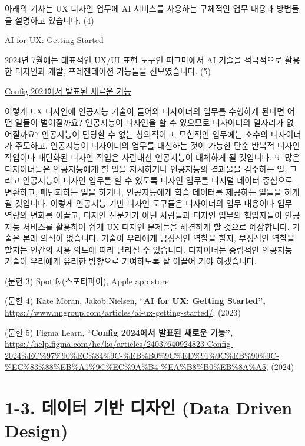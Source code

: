 \documentclass[
  letterpaper,
  DIV=11,
  numbers=noendperiod]{scrreprt}
\begin{document}
아래의 기사는 UX 디자인 업무에 AI 서비스를 사용하는 구체적인 업무 내용과
방법들을 설명하고 있습니다. (4)

\href{https://www.nngroup.com/articles/ai-ux-getting-started/}{AI for
UX: Getting Started}

2024년 7월에는 대표적인 UX/UI 표현 도구인 피그마에서 AI 기술을
적극적으로 활용한 디자인과 개발, 프레젠테이션 기능들을 선보였습니다. (5)

\href{https://help.figma.com/hc/ko/articles/24037640924823-Config-2024에서-발표된-새로운-기능}{Config
2024에서 발표된 새로운 기능}

이렇게 UX 디자인에 인공지능 기술이 들어와 디자이너의 업무를 수행하게
된다면 어떤 일들이 벌어질까요? 인공지능이 디자인을 할 수 있으므로
디자이너의 일자리가 없어질까요? 인공지능이 담당할 수 없는 창의적이고,
모험적인 업무에는 소수의 디자이너가 주도하고, 인공지능이 디자이너의
업무를 대신하는 것이 가능한 단순 반복적 디자인 작업이나 패턴화된 디자인
작업은 사람대신 인공지능이 대체하게 될 것입니다. 또 많은 디자이너들은
인공지능에게 할 일을 지시하거나 인공지능의 결과물을 검수하는 일, 그리고
인공지능이 디자인 업무를 할 수 있도록 디자인 업무를 디지털 데이터
중심으로 변환하고, 패턴화하는 일을 하거나, 인공지능에게 학습 데이터를
제공하는 일들을 하게 될 것입니다. 이렇게 인공지능 기반 디자인 도구들은
디자이너의 업무 내용이나 업무 역량의 변화를 이끌고, 디자인 전문가가 아닌
사람들과 디자인 업무의 협업자들이 인공지능 서비스를 활용하여 쉽게 UX
디자인 문제들을 해결하게 할 것으로 예상합니다. 기술은 본래 의식이
없습니다. 기술이 우리에게 긍정적인 역할을 할지, 부정적인 역할을 할지는
인간의 사용 의도에 따라 달라질 수 있습니다. 디자이너는 중립적인 인공지능
기술이 우리에게 유리한 방향으로 기여하도록 잘 이끌어 가야 하겠습니다.

(문헌 3) Spotify(스포티파이), Apple app store

(문헌 4) Kate Moran, Jakob Nielsen, ``\textbf{AI for UX: Getting
Started'',}
\url{https://www.nngroup.com/articles/ai-ux-getting-started/}, (2023)

(문헌 5) Figma Learn, ``\textbf{Config 2024에서 발표된 새로운 기능'',}
\url{https://help.figma.com/hc/ko/articles/24037640924823-Config-2024\%EC\%97\%90\%EC\%84\%9C-\%EB\%B0\%9C\%ED\%91\%9C\%EB\%90\%9C-\%EC\%83\%88\%EB\%A1\%9C\%EC\%9A\%B4-\%EA\%B8\%B0\%EB\%8A\%A5},
(2024)


\chapter{1-3. 데이터 기반 디자인 (Data Driven
Design)}\label{uxb370uxc774uxd130-uxae30uxbc18-uxb514uxc790uxc778-data-driven-design}
\end{document}
